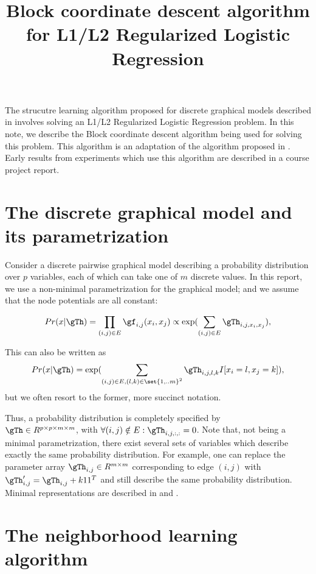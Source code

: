 \documentclass{article}
\title{Block coordinate descent algorithm for L1/L2 Regularized Logistic Regression}
\date{}
\begin{document}
\maketitle

\abstract
The strucutre learning algorithm proposed for discrete graphical models described in \citet{ravikumarIsing09} involves solving an L1/L2 Regularized Logistic Regression problem. In this note, we describe the Block coordinate descent algorithm being used for solving this problem. This algorithm is an adaptation of the algorithm proposed in \citet{meierRS2008}. Early results from experiments which use this algorithm are described in a course project report\cite{sparsityStructureAlgorithmsReport}.

\section{The discrete graphical model and its parametrization}
Consider a discrete pairwise graphical model describing a probability distribution over $p$ variables, each of which can take one of $m$ discrete values. In this report, we use a non-minimal parametrization for the graphical model; and we assume that the node potentials are all constant:

\begin{equation}
Pr(x|\gTh) = \prod_{(i, j) \in E}\gf_{i, j}(x_i, x_j) \propto \exp(\sum_{(i, j)\in E} \gTh_{i, j, x_i, x_j}),
\label{eqn:distributionDiscreteGM}
\end{equation}

This can also be written as $$Pr(x|\gTh) = \exp(\sum_{(i, j)\in E, (l, k) \in \set{1, .. m}^{2}} \gTh_{i, j, l, k} I[x_i = l, x_j = k]),$$ but we often resort to the former, more succinct notation.

Thus, a probability distribution is completely specified by\\ $\gTh \in R^{p \times p \times m \times m}$, with $\forall (i, j)\notin E: \gTh_{i, j, :, :} = 0$. Note that, not being a minimal parametrization, there exist several sets of variables which describe exactly the same probability distribution. For example, one can replace the parameter array $\gTh_{i, j} \in R^{m \times m}$ corresponding to edge $(i, j)$ with $\gTh'_{i, j} = \gTh_{i, j} + k 11^{T}$ and still describe the same probability distribution. Minimal representations are described in \citet{pradeepPrivate} and \citet{ravikumarIsing09}.

\section{The neighborhood learning algorithm}
\end{document}

